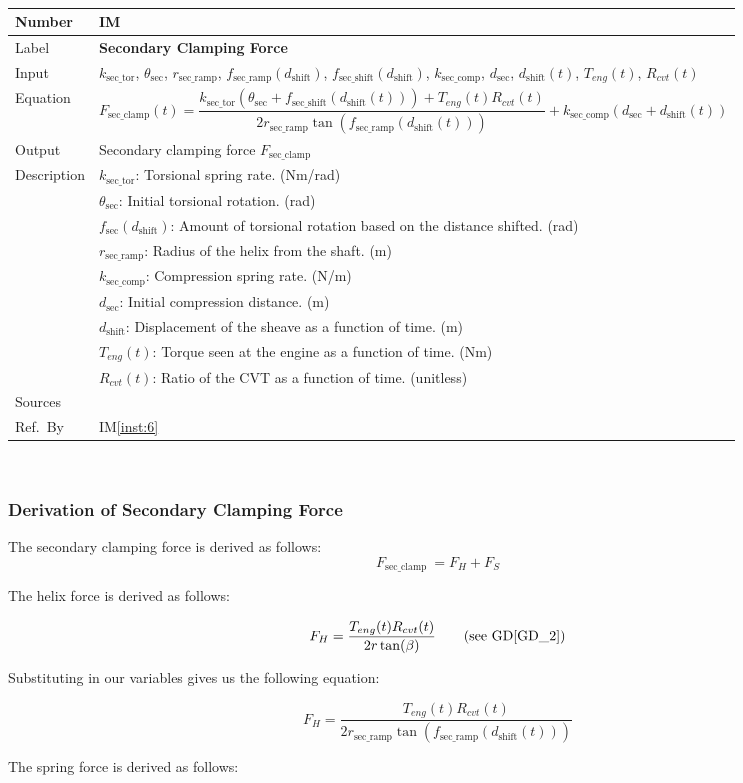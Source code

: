 \documentclass[12pt]{article}
\newcommand{\colAwidth}{0.13\textwidth}
\newcommand{\colBwidth}{0.82\textwidth}
\newcommand{\dref}[1]{GD\ref{#1}}
\newcounter{instnum} %
\newcommand{\iref}[1]{IM\ref{#1}}
\newcommand{\definstance}[7] {
~\newline
\noindent
\begin{minipage}{\textwidth}
\renewcommand*{\arraystretch}{1.5}
\begin{tabular}{| p{\colAwidth} | p{\colBwidth}|}
  \hline
  \rowcolor[gray]{0.9}
  Number& IM\refstepcounter{instnum}\theinstnum \label{inst:\theinstnum}\\
  \hline
  Label& \bf #1 \\
  \hline
  Input& #2\\
  \hline
  Equation& #3\\
  \hline
  Output& #4\\
  \hline
  Description& #5 \\
  \hline
  Sources& #6 \\
  \hline
  Ref.\ By & #7\\
  \hline
\end{tabular}
\end{minipage}\\
}
\begin{document}
\definstance
{Secondary Clamping Force}
{$k_{\text{sec\_tor}}$, $\theta_{\text{sec}}$, $r_{\text{sec\_ramp}}$, $f_{\text{sec\_ramp}}(d_{\text{shift}})$, $f_{\text{sec\_shift}}(d_{\text{shift}})$, $k_{\text{sec\_comp}}$, $d_{\text{sec}}$, $d_{\text{shift}}(t)$, $T_{eng}(t)$, $R_{cvt}(t)$} %
{\[
F_{\text{sec\_clamp}}(t) = \frac{k_{\text{sec\_tor}} (\theta_{\text{sec}} + f_{\text{sec\_shift}}(d_\text{shift}(t))) + T_{eng}(t) R_{cvt}(t)}{2 r_{\text{sec\_ramp}} \tan(f_{\text{sec\_ramp}}(d_{\text{shift}}(t)))} + k_{\text{sec\_comp}} (d_{\text{sec}} + d_{\text{shift}}(t))
\]} %
{Secondary clamping force $F_{\text{sec\_clamp}}$} %
{$k_{\text{sec\_tor}}$: Torsional spring rate. (Nm/rad)\\
  &$\theta_{\text{sec}}$: Initial torsional rotation. (rad)\\
  &$f_{\text{sec}}(d_{\text{shift}})$: Amount of torsional rotation based on the distance shifted. (rad) \\
  &$r_{\text{sec\_ramp}}$: Radius of the helix from the shaft. (m)\\
  &$k_{\text{sec\_comp}}$: Compression spring rate. (N/m)\\
  &$d_{\text{sec}}$: Initial compression distance. (m)\\
  &$d_{\text{shift}}$: Displacement of the sheave as a function of time. (m)\\
  &$T_{eng}(t)$: Torque seen at the engine as a function of time. (Nm) \\
  &$R_{cvt}(t)$: Ratio of the CVT as a function of time. (unitless)
} %
{} %
{\iref{inst:6}}

\subsubsection*{Derivation of Secondary Clamping Force}

The secondary clamping force is derived as follows:
\[
F_{\text{sec\_clamp}}\ = F_H + F_S
\]

The helix force is derived as follows:

\[
F_H = \frac{T_{eng}(t) R_{cvt}(t)}{2r\tan(\beta)}  \tag*{\text{(see \dref{GD_2})}} %
\]

Substituting in our variables gives us the following equation:

\[
F_H = \frac{T_{eng}(t) R_{cvt}(t)}{2 r_{\text{sec\_ramp}} \tan(f_{\text{sec\_ramp}}(d_\text{shift}(t)))}
\]

The spring force is derived as follows:
\end{document}
